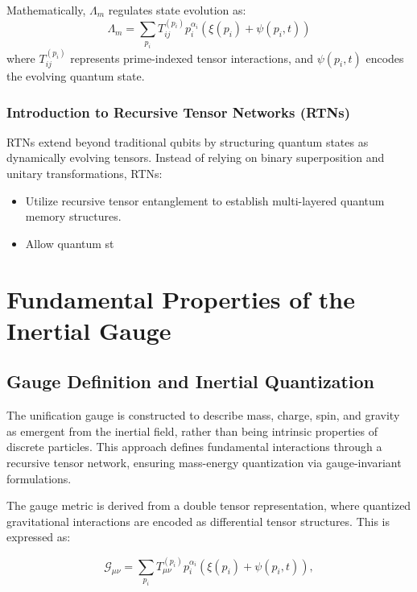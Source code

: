 \documentclass{article}
\theoremstyle{plain}
\begin{document}
\begin{itemize}
\begin{itemize}
Mathematically, $\Lambda_m$ regulates state evolution as:
\begin{equation}
    \Lambda_m = \sum_{p_i} T_{ij}^{(p_i)} p_i^{\alpha_i} \left( \xi(p_i) + \psi(p_i, t) \right)
\end{equation}
where $T_{ij}^{(p_i)}$ represents prime-indexed tensor interactions, and $\psi(p_i, t)$ encodes the evolving quantum state.

\subsubsection{Introduction to Recursive Tensor Networks (RTNs)}

RTNs extend beyond traditional qubits by structuring quantum states as dynamically evolving tensors. Instead of relying on binary superposition and unitary transformations, RTNs:
\begin{itemize}
    \item Utilize recursive tensor entanglement to establish multi-layered quantum memory structures.
    \item Allow quantum st
\end{itemize}

\section{Fundamental Properties of the Inertial Gauge}

\subsection{Gauge Definition and Inertial Quantization}

The unification gauge is constructed to describe mass, charge, spin, and gravity as emergent from the inertial field, rather than being intrinsic properties of discrete particles. This approach defines fundamental interactions through a recursive tensor network, ensuring mass-energy quantization via gauge-invariant formulations.

The gauge metric is derived from a double tensor representation, where quantized gravitational interactions are encoded as differential tensor structures. This is expressed as:

\begin{equation}
    \mathcal{G}_{\mu\nu} = \sum_{p_i} T_{\mu\nu}^{(p_i)} p_i^{\alpha_i} \left( \xi(p_i) + \psi(p_i, t) \right),
\end{equation}


\end{itemize}
\end{itemize}
\end{document}
